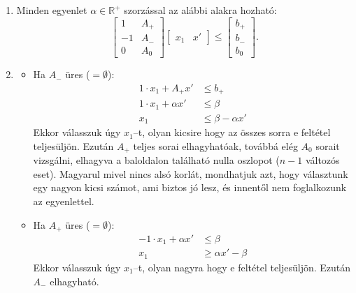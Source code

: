 \begin{enumerate}
	\item Minden egyenlet $\alpha \in \mathbb{R}^+$ szorzással az alábbi alakra
	      hozható:
	      \begin{displaymath}
		      \begin{bmatrix}
			      1  & A_+ \\
			      -1 & A_- \\
			      0  & A_0
		      \end{bmatrix}
		      \begin{bmatrix}
			      x_1 &
			      x'
		      \end{bmatrix}
		      \leq
		      \begin{bmatrix}
			      b_+ \\
			      b_- \\
			      b_0
		      \end{bmatrix}.
	      \end{displaymath}
	\item
	      \begin{itemize}
		      \item Ha $A_-$ üres ($=\emptyset$):
		            \begin{align*}
			            1 \cdot x_1 + A_+ x'    & \leq b_+               \\
			            1 \cdot x_1 + \alpha x' & \leq \beta             \\
			            x_1                     & \leq \beta - \alpha x'
		            \end{align*}
		            Ekkor válasszuk úgy $x_1$--t, olyan kicsire hogy az összes sorra e feltétel
		            teljesüljön. Ezután $A_+$ teljes sorai elhagyhatóak, továbbá elég $A_0$
		            sorait vizsgálni, elhagyva a baloldalon található nulla oszlopot ($n-1$
		            változós eset).
		            Magyarul mivel nincs alsó korlát, mondhatjuk azt, hogy választunk egy nagyon
		            kicsi számot, ami biztos jó lesz, és innentől nem foglalkozunk az
		            egyenlettel.
		      \item Ha $A_+$ üres ($=\emptyset$):
		            \begin{align*}
			            -1 \cdot x_1 + \alpha x' & \leq \beta             \\
			            x_1                      & \geq \alpha x' - \beta
		            \end{align*}
		            Ekkor válasszuk úgy $x_1$--t, olyan nagyra hogy e feltétel teljesüljön.
		            Ezután $A_-$ elhagyható.

\end{itemize}
\end{enumerate}
